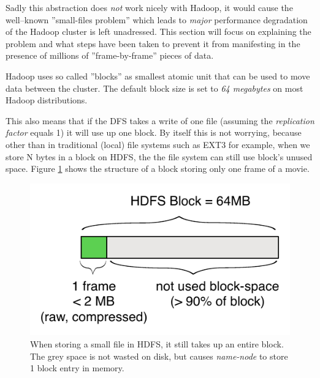 Sadly this abstraction does \textit{not} work nicely with Hadoop, it would cause the well--known ''small-files problem'' which leads to \textit{major} performance degradation of the Hadoop cluster is left unadressed. This section will focus on explaining the problem and what steps have been taken to prevent it from manifesting in the presence of millions of ''frame-by-frame'' pieces of data.

Hadoop uses so called ''blocks'' as smallest atomic unit that can be used to move data between the cluster.
The default block size is set to \textit{64 megabytes} on most Hadoop distributions.

This also means that if the DFS takes a write of one file (assuming the \textit{replication factor} equals 1) it will use up one block. By itself this is not worrying, because other than in traditional (local) file systems such as EXT3 for example, when we store N bytes in a block on HDFS,
the the file system can still use block's unused space. Figure \ref{fig:no-sequence-file} shows the structure of a block storing only one frame of a movie.

\begin{figure}[ch!]
  \centering
  \includegraphics[scale=0.9]{diagrams/no-sequence-file.pdf}
  \caption{When storing a small file in HDFS, it still takes up an entire block. The grey space is not wasted on disk, but causes \textit{name-node} to store 1 block entry in memory.}
  \label{fig:no-sequence-file}
\end{figure}


